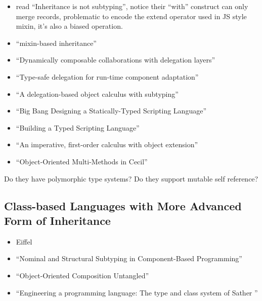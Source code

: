 \begin{itemize}
\item read ``Inheritance is not subtyping'', notice their ``with'' construct can
  only merge records, problematic to encode the extend operator used in JS style
  mixin, it's also a biased operation.

\item ``mixin-based inheritance''

\item ``Dynamically composable collaborations with delegation layers''

\item ``Type-safe delegation for run-time component adaptation''

\item ``A delegation-based object calculus with subtyping''

\item ``Big Bang Designing a Statically-Typed Scripting Language''

\item ``Building a Typed Scripting Language''

\item ``An imperative, first-order calculus with object extension''

\item ``Object-Oriented Multi-Methods in Cecil''

\end{itemize}

Do they have polymorphic type systems? Do they support mutable self reference?

\subsection{Class-based Languages with More Advanced Form of Inheritance}

\begin{itemize}
\item Eiffel

\item ``Nominal and Structural Subtyping in Component-Based Programming''
\item ``Object-Oriented Composition Untangled''
\item ``Engineering a programming language: The type and class system of Sather ''
\end{itemize}

